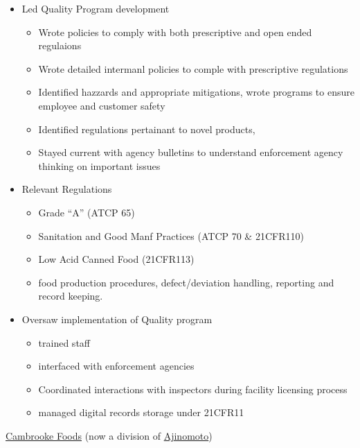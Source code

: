 \documentclass[10pt,a4paper]{article} %
\begin{document}
{{{\begin{itemize}
\item Led Quality Program development
\begin{itemize}
\item Wrote policies to comply with both prescriptive and open ended regulaions
\item Wrote detailed intermanl policies to comple with prescriptive regulations
\item Identified hazzards and appropriate mitigations, wrote programs to ensure employee and customer safety
\item Identified regulations pertainant to novel products, 
\item Stayed current with agency bulletins to understand enforcement agency thinking on important issues
\end{itemize}

\item Relevant Regulations %
\begin{itemize}
\item Grade ``A'' (ATCP 65)
\item Sanitation and Good Manf Practices (ATCP 70 \& 21CFR110)
\item Low Acid Canned Food (21CFR113)
\item food production procedures, defect/deviation handling, reporting and record keeping.
\end{itemize}

\item Oversaw implementation of Quality program
\begin{itemize}
\item trained staff
\item interfaced with enforcement agencies
\item Coordinated interactions with inspectors during facility licensing process
\item managed digital records storage under 21CFR11
\end{itemize}


\end{itemize}
    }
  }
}
\headedsection %
{\href{http://www.dharmapublishing.com}{Cambrooke Foods} (now a division of \href{https://www.ajinorthamerica.com/}{Ajinomoto})}
\end{document}
